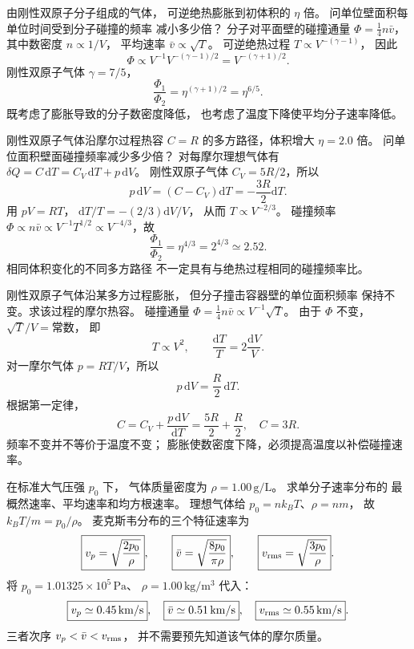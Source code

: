 由刚性双原子分子组成的气体，
可逆绝热膨胀到初体积的 $\eta$ 倍。
问单位壁面积每单位时间受到分子碰撞的频率
减小多少倍？
\exsolution
分子对平面壁的碰撞通量
$\Phi=\frac14 n\bar v$，
其中数密度 $n\propto1/V$，
平均速率 $\bar v\propto\sqrt T$。
可逆绝热过程
$T\propto V^{-(\gamma-1)}$，
因此
\[
\Phi\propto
V^{-1}V^{-(\gamma-1)/2}
=V^{-(\gamma+1)/2}.
\]
刚性双原子气体
$\gamma=7/5$，
\[
\boxed{\frac{\Phi_1}{\Phi_2}
=\eta^{(\gamma+1)/2}
=\eta^{6/5}}.
\]
\excheck 既考虑了膨胀导致的分子数密度降低，
也考虑了温度下降使平均分子速率降低。

刚性双原子气体沿摩尔过程热容
$C=R$ 的多方路径，体积增大
$\eta=2.0$ 倍。
问单位面积壁面碰撞频率减少多少倍？
\exsolution
对每摩尔理想气体有
$\delta Q=C\,\mathrm dT=
C_V\,\mathrm dT+p\,\mathrm dV$。
刚性双原子气体
$C_V=5R/2$，所以
\[
p\,\mathrm dV=(C-C_V)\mathrm dT
=-\frac{3R}{2}\mathrm dT.
\]
用 $pV=RT$，
$\mathrm dT/T=-(2/3)\mathrm dV/V$，
从而 $T\propto V^{-2/3}$。
碰撞频率
$\Phi\propto n\bar v\propto V^{-1}T^{1/2}
\propto V^{-4/3}$，故
\[
\boxed{\frac{\Phi_1}{\Phi_2}
=\eta^{4/3}=2^{4/3}\simeq2.52}.
\]
\excheck 相同体积变化的不同多方路径
不一定具有与绝热过程相同的碰撞频率比。

刚性双原子气体沿某多方过程膨胀，
但分子撞击容器壁的单位面积频率
保持不变。求该过程的摩尔热容。
\exsolution
碰撞通量
$\Phi=\tfrac14n\bar v\propto V^{-1}\sqrt T$。
由于 $\Phi$ 不变，
$\sqrt T/V=\text{常数}$，
即
\[
T\propto V^2,\qquad
\frac{\mathrm dT}{T}
=2\frac{\mathrm dV}{V}.
\]
对一摩尔气体
$p=RT/V$，所以
\[
p\,\mathrm dV=\frac R2\,\mathrm dT.
\]
根据第一定律，
\[
C=C_V+\frac{p\,\mathrm dV}{\mathrm dT}
=\frac{5R}{2}+\frac R2,
\quad
\boxed{C=3R}.
\]
\excheck 频率不变并不等价于温度不变；
膨胀使数密度下降，必须提高温度以补偿碰撞速率。

在标准大气压强 $p_0$ 下，
气体质量密度为
$\rho=1.00\,\mathrm{g/L}$。
求单分子速率分布的
最概然速率、平均速率和均方根速率。
\exsolution
理想气体给
$p_0=nk_BT$、$\rho=nm$，
故
$k_BT/m=p_0/\rho$。
麦克斯韦分布的三个特征速率为
\[
\boxed{v_p=\sqrt{\frac{2p_0}{\rho}}},\qquad
\boxed{\bar v=\sqrt{\frac{8p_0}{\pi\rho}}},\qquad
\boxed{v_{\rm rms}=\sqrt{\frac{3p_0}{\rho}}}.
\]
将
$p_0=1.01325\times10^5\,\mathrm{Pa}$、
$\rho=1.00\,\mathrm{kg/m^3}$ 代入：
\[
\boxed{v_p\simeq0.45\,\mathrm{km/s}},\quad
\boxed{\bar v\simeq0.51\,\mathrm{km/s}},\quad
\boxed{v_{\rm rms}\simeq0.55\,\mathrm{km/s}}.
\]
\excheck 三者次序
$v_p<\bar v<v_{\rm rms}$，
并不需要预先知道该气体的摩尔质量。

